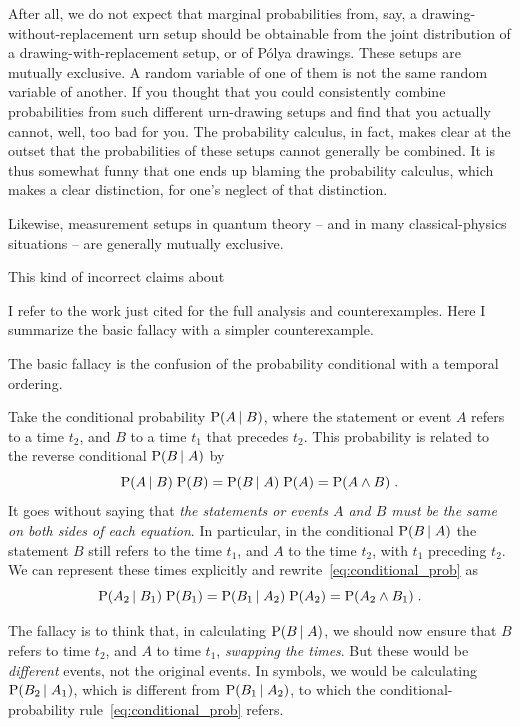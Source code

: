 \documentclass[\ifafour a4paper,12pt,\else a5paper,10pt,\fi%
onecolumn,oneside,article,%
british%
]{memoir}
\theoremstyle{remark}
\theoremstyle{innote}
\newcommand*{\p}{\mathrm{P}}%
\renewcommand*{\|}[1][]{\nonscript\,#1\vert\nonscript\;\mathopen{}}
\begin{document}
After all, we do not expect that marginal probabilities from, say, a
drawing-without-replacement urn setup should be obtainable from the joint
distribution of a drawing-with-replacement setup, or of P\'olya drawings.
These setups are mutually exclusive. A random variable of one of them is
not the same random variable of another. If you thought that you could
consistently combine probabilities from such different urn-drawing setups
and find that you actually cannot, well, too bad for you. The probability
calculus, in fact, makes clear at the outset that the probabilities of these
setups cannot generally be combined. It is thus somewhat funny that one
ends up blaming the probability calculus, which makes a clear distinction,
for one's neglect of that distinction.


Likewise, measurement setups
in quantum theory -- and in many classical-physics situations -- are
generally mutually exclusive.

This kind of incorrect claims about

I refer to the work just cited for the full analysis and counterexamples.
Here I summarize the basic fallacy with a simpler counterexample.

\medskip

The basic fallacy is the confusion of the probability conditional with a
temporal ordering.

Take the conditional probability $\p(A \| B)$, where the statement or event
$A$ refers to a time $t_{2}$, and $B$ to a time $t_{1}$ that precedes
$t_{2}$. This probability is related to the reverse conditional
$\p(B \| A)$ by
\begin{equation}
  \label{eq:conditional_prob}
  \p(A \| B)\; \p(B) = \p(B \| A) \; \p(A) = \p(A \land B) \;.
\end{equation}
It goes without saying that \emph{the statements or events $A$ and $B$ must
  be the same on both sides of each equation}. In particular, in the
conditional $\p(B \| A)$ the statement $B$ still refers to the time
$t_{1}$, and $A$ to the time $t_{2}$, with $t_{1}$ preceding $t_{2}$. We
can represent these times explicitly and
rewrite~\eqref{eq:conditional_prob} as
\begin{equation}
  \label{eq:conditional_prob_time}
  \p(A_{2} \| B_{1})\; \p(B_{1}) = \p(B_{1} \| A_{2}) \; \p(A_{2})
  = \p(A_{2} \land B_{1}) \;.
\end{equation}

The fallacy is to think that, in calculating $\p(B \| A)$, we should now
ensure that $B$ refers to time $t_{2}$, and $A$ to time $t_{1}$, \emph{swapping
the times}. But these would be \emph{different} events, not the original
events. In symbols, we would be calculating $\p(B_{2} \| A_{1})$, which is
different from $\p(B_{1} \| A_{2})$, to which the conditional-probability
rule~\eqref{eq:conditional_prob} refers.
\end{document}
